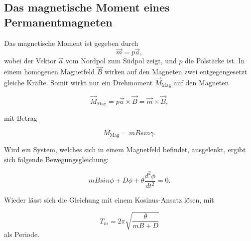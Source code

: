 \subsection{Das magnetische Moment eines Permanentmagneten}
Das magnetische Moment ist gegeben durch
\begin{equation}
  \vec{m} = p \vec{a} ,
\end{equation}
wobei der Vektor $\vec{a}$ vom Nordpol zum Südpol zeigt, und $p$ die Polstärke ist.
In einem homogenen Magnetfeld $\vec{B}$ wirken auf den Magneten zwei entgegengesetzt gleiche Kräfte. Somit wirkt nur ein Drehmoment $\vec{M}_\text{Mag}$
auf den Magneten

\begin{equation}
  \vec{M}_\text{Mag} = p \vec{a} \times \vec{B} = \vec{m} \times \vec{B} ,
\end{equation}

mit Betrag

\begin{equation}
 M_\text{Mag} = m B sin\gamma .
\end{equation}

Wird ein System, welches sich in einem Magnetfeld befindet, ausgelenkt, ergibt sich folgende Bewegungsgleichung:

\begin{equation}
  m B sin\phi + D \phi + \theta \frac{d^{2}\phi}{dt^{2}} = 0 .
\end{equation}

Wieder lässt sich die Gleichung mit einem Kosinus-Ansatz lösen, mit

\begin{equation}
  T_m = 2\pi \sqrt{\frac{\theta}{m B + D}}
\end{equation}
als Periode.




